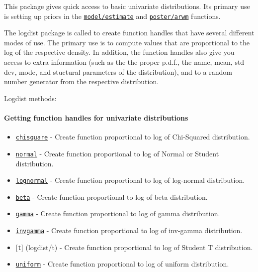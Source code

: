 

	This package gives quick access to basic univariate distributions. Its
primary use is setting up priors in the
\href{model/estimate}{\texttt{model/estimate}} and
\href{poster/arwm}{\texttt{poster/arwm}} functions.

The logdist package is called to create function handles that have
several different modes of use. The primary use is to compute values
that are proportional to the log of the respective density. In addition,
the function handles also give you access to extra information (such as
the the proper p.d.f., the name, mean, std dev, mode, and stuctural
parameters of the distribution), and to a random number generator from
the respective distribution.

Logdist methods:

\paragraph{Getting function handles for univariate
distributions}

\begin{itemize}
\itemsep1pt\parskip0pt
\item
  \href{logdist/chisquare}{\texttt{chisquare}} - Create function
  proportional to log of Chi-Squared distribution.
\item
  \href{logdist/normal}{\texttt{normal}} - Create function proportional
  to log of Normal or Student distribution.
\item
  \href{logdist/lognormal}{\texttt{lognormal}} - Create function
  proportional to log of log-normal distribution.
\item
  \href{logdist/beta}{\texttt{beta}} - Create function proportional to
  log of beta distribution.
\item
  \href{logdist/gamma}{\texttt{gamma}} - Create function proportional to
  log of gamma distribution.
\item
  \href{logdist/invgamma}{\texttt{invgamma}} - Create function
  proportional to log of inv-gamma distribution.
\item
  {[}\texttt{t}{]} (logdist/t) - Create function proportional to log of
  Student T distribution.
\item
  \href{logdist/uniform}{\texttt{uniform}} - Create function
  proportional to log of uniform distribution.
\end{itemize}

